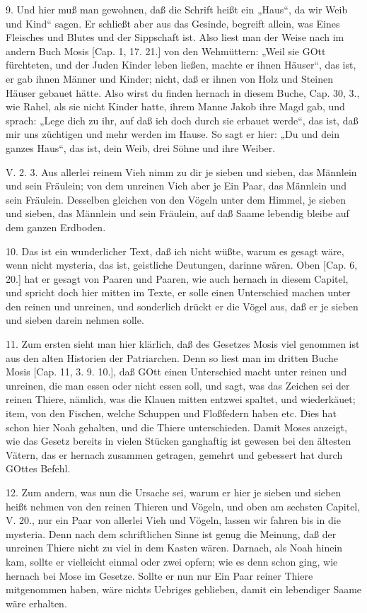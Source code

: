 9. Und hier muß man gewohnen, daß die Schrift heißt ein „Haus“, da wir Weib und Kind“ sagen. Er schließt aber aus das Gesinde, begreift allein, was Eines Fleisches und Blutes und der Sippschaft ist. Also liest man der Weise nach im andern Buch Mosis [Cap. 1, 17. 21.] von den Wehmüttern: „Weil sie GOtt fürchteten, und der Juden Kinder leben ließen, machte er ihnen Häuser“, das ist, er gab ihnen Männer und Kinder; nicht, daß er ihnen von Holz und Steinen Häuser gebauet hätte. Also wirst du finden hernach in diesem Buche, Cap. 30, 3., wie Rahel, als sie nicht Kinder hatte, ihrem Manne Jakob ihre Magd gab, und sprach: „Lege dich zu ihr, auf daß ich doch durch sie erbauet werde“, das ist, daß mir uns züchtigen und mehr werden im Hause. So sagt er hier: „Du und dein ganzes Haus“, das ist, dein Weib, drei Söhne und ihre Weiber.

\begin{schriftzitat}
V. 2. 3. Aus allerlei reinem Vieh nimm zu dir je sieben und sieben, das Männlein und sein Fräulein; von dem unreinen Vieh aber je Ein Paar, das Männlein und sein Fräulein. Desselben gleichen von den Vögeln unter dem Himmel, je sieben und sieben, das Männlein und sein Fräulein, auf daß Saame lebendig bleibe auf dem ganzen Erdboden.
\end{schriftzitat}

10. Das ist ein wunderlicher Text, daß ich nicht wüßte, warum es gesagt wäre, wenn nicht mysteria, das ist, geistliche Deutungen, darinne wären. Oben [Cap. 6, 20.] hat er gesagt von Paaren und Paaren, wie auch hernach in diesem Capitel, und spricht doch hier mitten im Texte, er solle einen Unterschied machen unter den reinen und unreinen, und sonderlich drückt er die Vögel aus, daß er je sieben und sieben darein nehmen solle.

11. Zum ersten sieht man hier klärlich, daß des Gesetzes Mosis viel genommen ist aus den alten Historien der Patriarchen. Denn so liest man im dritten Buche Mosis [Cap. 11, 3. 9. 10.], daß GOtt einen Unterschied macht unter reinen und unreinen, die man essen oder nicht essen soll, und sagt, was das Zeichen sei der reinen Thiere, nämlich, was die Klauen mitten entzwei spaltet, und wiederkäuet; item, von den Fischen, welche Schuppen und Floßfedern haben etc. Dies hat schon hier Noah gehalten, und die Thiere unterschieden. Damit Moses anzeigt, wie das Gesetz bereits in vielen Stücken ganghaftig ist gewesen bei den ältesten Vätern, das er hernach zusammen getragen, gemehrt und gebessert hat durch GOttes Befehl.

12. Zum andern, was nun die Ursache sei, warum er hier je sieben und sieben heißt nehmen von den reinen Thieren und Vögeln, und oben am sechsten Capitel, V. 20., nur ein Paar von allerlei Vieh und Vögeln, lassen wir fahren bis in die mysteria. Denn nach dem schriftlichen Sinne ist genug die Meinung, daß der unreinen Thiere nicht zu viel in dem Kasten wären. Darnach, als Noah hinein kam, sollte er vielleicht einmal oder zwei opfern; wie es denn schon ging, wie hernach bei Mose im Gesetze. Sollte er nun nur Ein Paar reiner Thiere mitgenommen haben, wäre nichts Uebriges geblieben, damit ein lebendiger Saame wäre erhalten.

